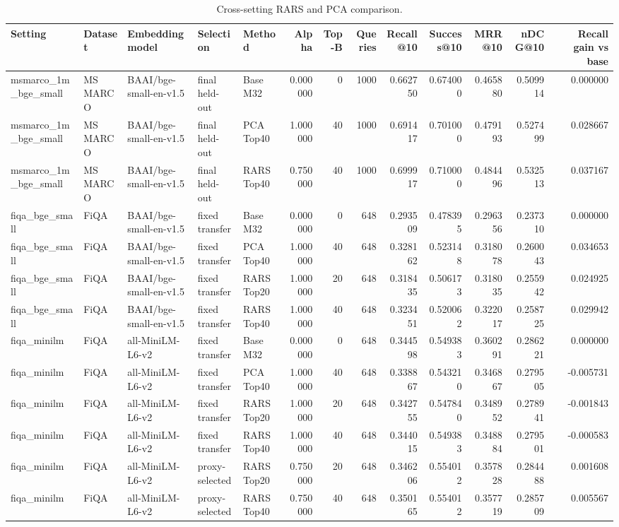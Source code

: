 \begin{table}[t]
\caption{Cross-setting RARS and PCA comparison.}
\label{tab:rars-cross-setting}
\begin{tabular}{lllllrrrrrrrr}
\toprule
Setting & Dataset & Embedding model & Selection & Method & Alpha & Top-B & Queries & Recall@10 & Success@10 & MRR@10 & nDCG@10 & Recall gain vs base \\
\midrule
msmarco\_1m\_bge\_small & MS MARCO & BAAI/bge-small-en-v1.5 & final held-out & Base M32 & 0.000000 & 0 & 1000 & 0.662750 & 0.674000 & 0.465880 & 0.509914 & 0.000000 \\
msmarco\_1m\_bge\_small & MS MARCO & BAAI/bge-small-en-v1.5 & final held-out & PCA Top40 & 1.000000 & 40 & 1000 & 0.691417 & 0.701000 & 0.479193 & 0.527499 & 0.028667 \\
msmarco\_1m\_bge\_small & MS MARCO & BAAI/bge-small-en-v1.5 & final held-out & RARS Top40 & 0.750000 & 40 & 1000 & 0.699917 & 0.710000 & 0.484496 & 0.532513 & 0.037167 \\
fiqa\_bge\_small & FiQA & BAAI/bge-small-en-v1.5 & fixed transfer & Base M32 & 0.000000 & 0 & 648 & 0.293509 & 0.478395 & 0.296356 & 0.237310 & 0.000000 \\
fiqa\_bge\_small & FiQA & BAAI/bge-small-en-v1.5 & fixed transfer & PCA Top40 & 1.000000 & 40 & 648 & 0.328162 & 0.523148 & 0.318078 & 0.260043 & 0.034653 \\
fiqa\_bge\_small & FiQA & BAAI/bge-small-en-v1.5 & fixed transfer & RARS Top20 & 1.000000 & 20 & 648 & 0.318435 & 0.506173 & 0.318035 & 0.255942 & 0.024925 \\
fiqa\_bge\_small & FiQA & BAAI/bge-small-en-v1.5 & fixed transfer & RARS Top40 & 1.000000 & 40 & 648 & 0.323451 & 0.520062 & 0.322017 & 0.258725 & 0.029942 \\
fiqa\_minilm & FiQA & all-MiniLM-L6-v2 & fixed transfer & Base M32 & 0.000000 & 0 & 648 & 0.344598 & 0.549383 & 0.360291 & 0.286221 & 0.000000 \\
fiqa\_minilm & FiQA & all-MiniLM-L6-v2 & fixed transfer & PCA Top40 & 1.000000 & 40 & 648 & 0.338867 & 0.543210 & 0.346867 & 0.279505 & -0.005731 \\
fiqa\_minilm & FiQA & all-MiniLM-L6-v2 & fixed transfer & RARS Top20 & 1.000000 & 20 & 648 & 0.342755 & 0.547840 & 0.348952 & 0.278941 & -0.001843 \\
fiqa\_minilm & FiQA & all-MiniLM-L6-v2 & fixed transfer & RARS Top40 & 1.000000 & 40 & 648 & 0.344015 & 0.549383 & 0.348884 & 0.279501 & -0.000583 \\
fiqa\_minilm & FiQA & all-MiniLM-L6-v2 & proxy-selected & RARS Top20 & 0.750000 & 20 & 648 & 0.346206 & 0.554012 & 0.357828 & 0.284488 & 0.001608 \\
fiqa\_minilm & FiQA & all-MiniLM-L6-v2 & proxy-selected & RARS Top40 & 0.750000 & 40 & 648 & 0.350165 & 0.554012 & 0.357719 & 0.285709 & 0.005567 \\
\bottomrule
\end{tabular}
\end{table}
